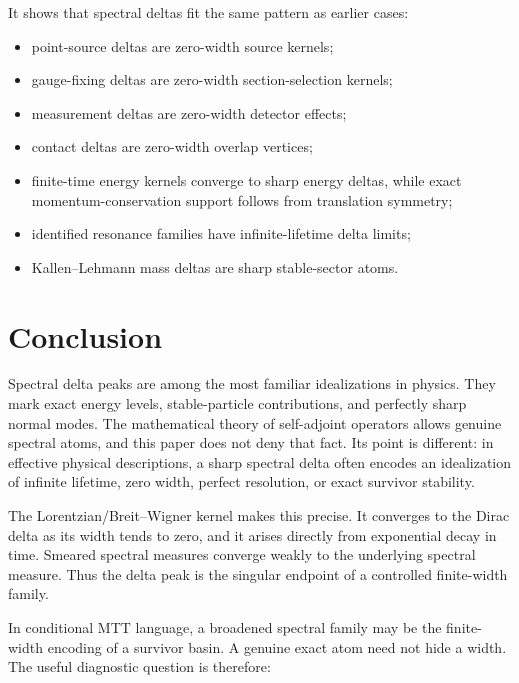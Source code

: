 \documentclass[11pt]{article}
\begin{document}
It shows that spectral deltas fit the same pattern as earlier cases:
\begin{itemize}
\item point-source deltas are zero-width source kernels;
\item gauge-fixing deltas are zero-width section-selection kernels;
\item measurement deltas are zero-width detector effects;
\item contact deltas are zero-width overlap vertices;
\item finite-time energy kernels converge to sharp energy deltas, while exact
momentum-conservation support follows from translation symmetry;
\item identified resonance families have infinite-lifetime delta limits;
\item Kallen--Lehmann mass deltas are sharp stable-sector atoms.
\end{itemize}

\section{Conclusion}

Spectral delta peaks are among the most familiar idealizations in physics. They mark exact energy levels, stable-particle contributions, and perfectly sharp normal modes. The mathematical theory of self-adjoint operators allows genuine spectral atoms, and this paper does not deny that fact. Its point is different: in effective physical descriptions, a sharp spectral delta often encodes an idealization of infinite lifetime, zero width, perfect resolution, or exact survivor stability.

The Lorentzian/Breit--Wigner kernel makes this precise. It converges to the Dirac delta as its width tends to zero, and it arises directly from exponential decay in time. Smeared spectral measures converge weakly to the underlying spectral measure. Thus the delta peak is the singular endpoint of a controlled finite-width family.

In conditional MTT language, a broadened spectral family may be the finite-width encoding of
a survivor basin. A genuine exact atom need not hide a width. The useful diagnostic question
is therefore:

\begin{center}
\end{center}
\end{document}
